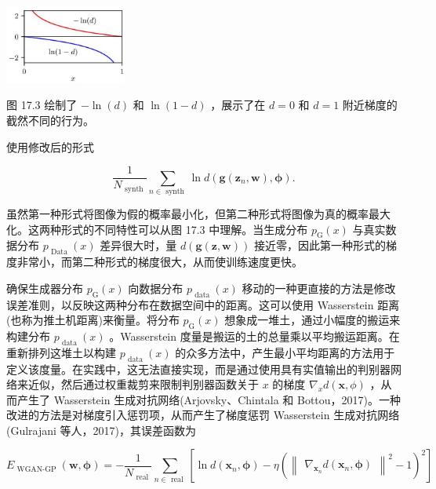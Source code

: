 \documentclass[10pt]{article}
\begin{document}
\begin{center}
\includegraphics[max width=0.3\textwidth]{images/0194e279-9b28-703a-88f4-c3ac21e2010d_557_1105_344_436_282_0.jpg}
\end{center}
\hspace*{3em} 

图 17.3 绘制了 \(- \ln \left( d\right)\) 和 \(\ln \left( {1 - d}\right)\) ，展示了在 \(d = 0\) 和 \(d = 1\) 附近梯度的截然不同的行为。

使用修改后的形式

\[
\frac{1}{{N}_{\text{ synth }}}\mathop{\sum }\limits_{{n \in  \text{ synth }}}\ln d\left( {\mathbf{g}\left( {{\mathbf{z}}_{n},\mathbf{w}}\right) ,\mathbf{\phi }}\right) . \tag{17.10}
\]

虽然第一种形式将图像为假的概率最小化，但第二种形式将图像为真的概率最大化。这两种形式的不同特性可以从图 17.3 中理解。当生成分布 \({p}_{\mathrm{G}}\left( x\right)\) 与真实数据分布 \({p}_{\text{ Data }}\left( x\right)\) 差异很大时，量 \(d\left( {\mathbf{g}\left( {\mathbf{z},\mathbf{w}}\right) }\right)\) 接近零，因此第一种形式的梯度非常小，而第二种形式的梯度很大，从而使训练速度更快。

确保生成器分布 \({p}_{\mathrm{G}}\left( x\right)\) 向数据分布 \({p}_{\text{ data }}\left( x\right)\) 移动的一种更直接的方法是修改误差准则，以反映这两种分布在数据空间中的距离。这可以使用 Wasserstein 距离(也称为推土机距离)来衡量。将分布 \({p}_{\mathrm{G}}\left( x\right)\) 想象成一堆土，通过小幅度的搬运来构建分布 \({p}_{\text{ data }}\left( x\right)\) 。Wasserstein 度量是搬运的土的总量乘以平均搬运距离。在重新排列这堆土以构建 \({p}_{\text{ data }}\left( x\right)\) 的众多方法中，产生最小平均距离的方法用于定义该度量。在实践中，这无法直接实现，而是通过使用具有实值输出的判别器网络来近似，然后通过权重裁剪来限制判别器函数关于 \(x\) 的梯度 \({\nabla }_{x}d\left( {\mathbf{x},\phi }\right)\) ，从而产生了 Wasserstein 生成对抗网络(Arjovsky、Chintala 和 Bottou，2017)。一种改进的方法是对梯度引入惩罚项，从而产生了梯度惩罚 Wasserstein 生成对抗网络(Gulrajani 等人，2017)，其误差函数为

\[
{E}_{\text{ WGAN-GP }}\left( {\mathbf{w},\mathbf{\phi }}\right)  =  - \frac{1}{{N}_{\text{ real }}}\mathop{\sum }\limits_{{n \in  \text{ real }}}\left\lbrack  {\ln d\left( {{\mathbf{x}}_{n},\mathbf{\phi }}\right)  - \eta {\left( {\begin{Vmatrix}{\nabla }_{{\mathbf{x}}_{n}}d\left( {\mathbf{x}}_{n},\mathbf{\phi }\right) \end{Vmatrix}}^{2} - 1\right) }^{2}}\right\rbrack
\]
\end{document}
